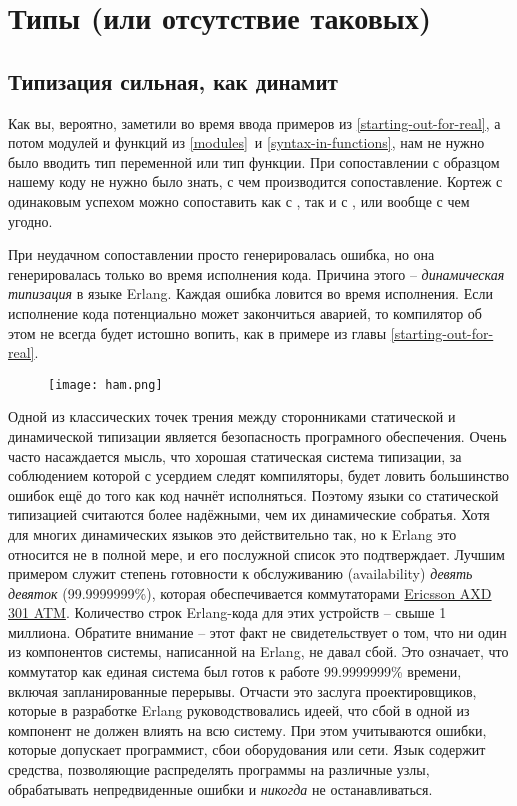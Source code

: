 \chapter{Типы (или отсутствие таковых)}
\label{types-or-lack-thereof}
\section{Типизация сильная, как динамит}
\label{dynamite-strong-typing}
Как вы, вероятно, заметили во время ввода примеров из \ref{starting-out-for-real}, а потом модулей и функций из \ref{modules}~и \ref{syntax-in-functions}, нам не нужно было вводить тип переменной или тип функции.
При сопоставлении с образцом нашему коду не нужно было знать, с чем производится сопоставление.
Кортеж  с одинаковым успехом можно сопоставить как с , так и с ,  или вообще с чем угодно.

При неудачном сопоставлении просто генерировалась ошибка, но она генерировалась только во время исполнения кода.
Причина этого \--- \emph{динамическая типизация} в языке Erlang.
Каждая ошибка ловится во время исполнения.
Если исполнение кода потенциально может закончиться аварией, то компилятор об этом не всегда будет истошно вопить, как в примере  из главы \ref{starting-out-for-real}.

\begin{figure}[h!]
    \centering
    \texttt{[image: ham.png]}
\end{figure} 
Одной из классических точек трения между сторонниками статической и динамической типизации является безопасность програмного обеспечения.
Очень часто насаждается мысль, что хорошая статическая система типизации, за соблюдением которой с усердием следят компиляторы, будет ловить большинство ошибок ещё до того как код начнёт исполняться.
Поэтому языки со статической типизацией считаются более надёжными, чем их динамические собратья.
Хотя для многих динамических языков это действительно так, но к Erlang это относится не в полной мере, и его послужной список это подтверждает.
Лучшим примером служит степень готовности к обслуживанию (availability) \emph{девять девяток} (99.9999999\%), которая обеспечивается коммутаторами \href{http://www.erlang.se/publications/Ulf_Wiger.pdf}{Ericsson AXD 301 ATM}.
Количество строк Erlang\--кода для этих устройств \--- свыше 1 миллиона.
Обратите внимание \--- этот факт не свидетельствует о том, что ни один из компонентов системы, написанной на Erlang, не давал сбой.
Это означает, что коммутатор как единая система был готов к работе 99.9999999\% времени, включая запланированные перерывы.
Отчасти это заслуга проектировщиков, которые в разработке Erlang руководствовались идеей, что сбой в одной из компонент не должен влиять на всю систему.
При этом учитываются ошибки, которые допускает программист, сбои оборудования или сети.
Язык содержит средства, позволяющие распределять программы на различные узлы, обрабатывать непредвиденные ошибки и \emph{никогда} не останавливаться.

